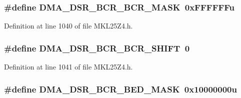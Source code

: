 \subsubsection[{\texorpdfstring{D\+M\+A\+\_\+\+D\+S\+R\+\_\+\+B\+C\+R\+\_\+\+B\+C\+R\+\_\+\+M\+A\+SK}{DMA_DSR_BCR_BCR_MASK}}]{\setlength{\rightskip}{0pt plus 5cm}\#define D\+M\+A\+\_\+\+D\+S\+R\+\_\+\+B\+C\+R\+\_\+\+B\+C\+R\+\_\+\+M\+A\+SK~0x\+F\+F\+F\+F\+F\+Fu}\hypertarget{group___d_m_a___register___masks_ga51f1a407dbca889f0b21bb1eeaa1c5d0}{}\label{group___d_m_a___register___masks_ga51f1a407dbca889f0b21bb1eeaa1c5d0}


Definition at line 1040 of file M\+K\+L25\+Z4.\+h.

\subsubsection[{\texorpdfstring{D\+M\+A\+\_\+\+D\+S\+R\+\_\+\+B\+C\+R\+\_\+\+B\+C\+R\+\_\+\+S\+H\+I\+FT}{DMA_DSR_BCR_BCR_SHIFT}}]{\setlength{\rightskip}{0pt plus 5cm}\#define D\+M\+A\+\_\+\+D\+S\+R\+\_\+\+B\+C\+R\+\_\+\+B\+C\+R\+\_\+\+S\+H\+I\+FT~0}\hypertarget{group___d_m_a___register___masks_ga7eb36602370f4118640f57d51913ff89}{}\label{group___d_m_a___register___masks_ga7eb36602370f4118640f57d51913ff89}


Definition at line 1041 of file M\+K\+L25\+Z4.\+h.

\subsubsection[{\texorpdfstring{D\+M\+A\+\_\+\+D\+S\+R\+\_\+\+B\+C\+R\+\_\+\+B\+E\+D\+\_\+\+M\+A\+SK}{DMA_DSR_BCR_BED_MASK}}]{\setlength{\rightskip}{0pt plus 5cm}\#define D\+M\+A\+\_\+\+D\+S\+R\+\_\+\+B\+C\+R\+\_\+\+B\+E\+D\+\_\+\+M\+A\+SK~0x10000000u}\hypertarget{group___d_m_a___register___masks_ga958e11f5f7fed3d90bdb94d1c1ff4179}{}\label{group___d_m_a___register___masks_ga958e11f5f7fed3d90bdb94d1c1ff4179}


